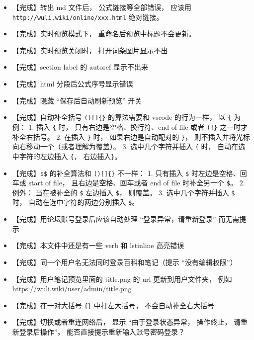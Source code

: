 \begin{itemize}
\item 【完成】转出 md 文件后， 公式链接等全部错误， 应该用 \verb|http://wuli.wiki/online/xxx.html| 绝对链接。

\item 【完成】实时预览模式下， 重命名后预览中标题不会更新。

\item 【完成】实时预览关闭时， 打开词条图片显示不出

\item 【完成】section label 的 autoref 显示不出来

\item 【完成】html 分段后公式序号显示错误

\item 【完成】隐藏 “保存后自动刷新预览” 开关

\item 【完成】自动补全括号 \verb|()[]{}| 的算法需要和 vscode 的行为一样， 以 \verb|{| 为例： 1. 插入 \verb|{| 时， 只有右边是空格、换行符、end of file 或者 \verb|)]}| 之一时才补全右括号。 2.  在插入 \verb|}| 时， 如果右边是自动配对的 \verb|}|， 则不插入并将光标向右移动一个（或者理解为覆盖）。 3. 选中几个字符并插入 \verb|{| 时， 自动在选中字符的左边插入 \verb|{|， 右边插入\verb|}|。

\item 【完成】\verb|$$| 的补全算法和 \verb|()[]{}| 不一样： 1. 只有插入 \verb|$| 时左边是空格、回车或 start of file， 且右边是空格、回车或者 end of file 时补全另一个 \verb|$|。 2. 例外： 当在被补全的 \verb|$| 左边插入 \verb|$|， 则覆盖。 3. 选中几个字符并插入 \verb|$| 时， 自动在选中字符的两边分别插入 \verb|$|。

\item 【完成】用论坛账号登录后应该自动处理 “登录异常，请重新登录” 而无需提示

\item 【完成】本文件中还是有一些 verb 和 lstinline 高亮错误

\item 【完成】同一个用户名无法同时登录百科和笔记（提示 “没有编辑权限”）

\item 【完成】用户笔记预览里面的 title.png 的 url 更新到用户文件夹， 例如 https://wuli.wiki/user/admin/title.png

\item 【完成】在一对大括号 \verb|{}| 中打左大括号， 不会自动补全右大括号

\item 【完成】切换或者重连网络后， 显示 “由于登录状态异常， 操作终止， 请重新登录后操作”。 能否直接提示重新输入账号密码登录？


\end{itemize}
